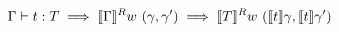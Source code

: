 

\begin{theorem}
  \begin{displaymath}
    {\Gamma} \vdash t : T \implies \llbracket {\Gamma} \rrbracket^R w~(\gamma, \gamma') \implies \llbracket T \rrbracket^R w~(\llbracket t \rrbracket\gamma, \llbracket t \rrbracket\gamma')
  \end{displaymath}
\end{theorem}


